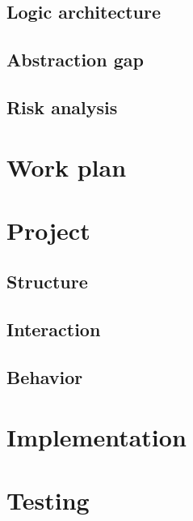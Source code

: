 \subsection{Logic architecture}
\subsection{Abstraction gap}
\subsection{Risk analysis}

\section{Work plan}

\section{Project}

\subsection{Structure}
\subsection{Interaction}
\subsection{Behavior}

\section{Implementation}

\section{Testing}

